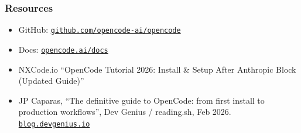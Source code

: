 \begin{frame}[fragile]\frametitle{ Resources}
  \begin{itemize}
	\item GitHub: \href{https://github.com/opencode-ai/opencode}{\texttt{github.com/opencode-ai/opencode}}
	\item Docs: \href{https://opencode.ai/docs}{\texttt{opencode.ai/docs}}
	\item NXCode.io ``OpenCode Tutorial 2026: Install \& Setup After Anthropic Block (Updated Guide)''
	\item JP Caparas, ``The definitive guide to OpenCode: from first install to production workflows'', Dev Genius / reading.sh, Feb 2026. \href{https://blog.devgenius.io/the-definitive-guide-to-opencode-from-first-install-to-production-workflows-aae1e95855fb}{\texttt{blog.devgenius.io}}
  \end{itemize}
\end{frame}
